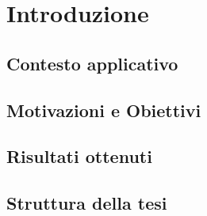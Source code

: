 \chapter{Introduzione}
\section{Contesto applicativo}

\section{Motivazioni e Obiettivi}

\section{Risultati ottenuti}

\section{Struttura della tesi}
